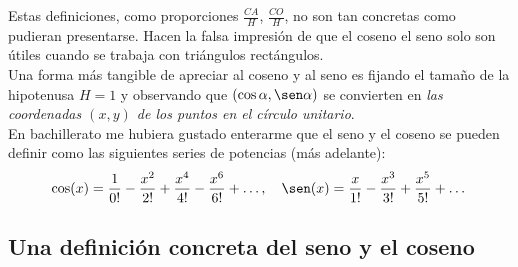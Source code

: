 Estas definiciones, como proporciones $\frac{CA}{H}$, $\frac{CO}{H}$, no son tan concretas como pudieran presentarse. Hacen la falsa impresión de que el coseno el seno solo son útiles cuando se trabaja con triángulos rectángulos.\\ 

Una forma más tangible de apreciar al coseno y al seno es fijando el tamaño de la hipotenusa $H=1$ y observando que $(\cos\alpha, \sen\alpha)$ se convierten en \emph{las coordenadas  $(x,y)$ de los puntos en el círculo unitario}.\\

En bachillerato me hubiera gustado enterarme que el seno y el coseno se pueden definir como las siguientes series de potencias (más adelante):
$$\cos(x)=\frac{1}{0!}-\frac{x^2}{2!}+\frac{x^4}{4!}-\frac{x^6}{6!}+\dots,\quad   \sen(x)=\frac{x}{1!}-\frac{x^3}{3!}+\frac{x^5}{5!}+\dots$$

\subsection*{Una definición concreta del seno y el coseno}

